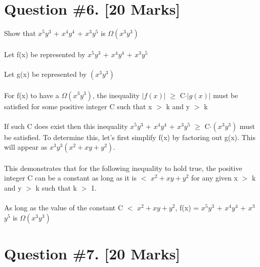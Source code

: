 \documentclass{article}
\begin{document}
\section{Question \#6. [20 Marks]}
Show that $x^5$$y^3$ + $x^4$$y^4$ + $x^3$$y^5$ is $\Omega(x^3y^3)$ \\ \\
Let f(x) be represented by $x^5$$y^3$ + $x^4$$y^4$ + $x^3$$y^5$ \\ \\
Let g(x) be represented by $(x^3y^3)$ \\\\
For f(x) to have a $\Omega(x^3y^3)$, the inequality $\left| f(x) \right|$ $\geq$ C$\cdot$$\left| g(x) \right|$ must be satisfied for some positive integer C such that x $>$ k and y $>$ k \\ \\ 
If such C does exist then this inequality $x^5$$y^3$ + $x^4$$y^4$ + $x^3$$y^5$ $\geq$ C$\cdot (x^3y^3)$ must be satisfied. To determine this, let's first simplify f(x) by factoring out g(x).  This will appear as  
$x^3y^3 (x^2 +xy + y^2)$. \\ \\
This demonstrates that for the following inequality to hold true, the positive integer C can be a constant as long as it is $<$  $x^2 +xy + y^2$ for any given x $>$ k and y $>$ k such that k $>$ 1.  \\\\
As long as the value of the constant C $<$  $x^2 +xy + y^2$, f(x) = $x^5$$y^3$ + $x^4$$y^4$ + $x^3$$y^5$ is $\Omega(x^3y^3)$
\newpage
\section{Question \#7. [20 Marks]}
\end{document}
